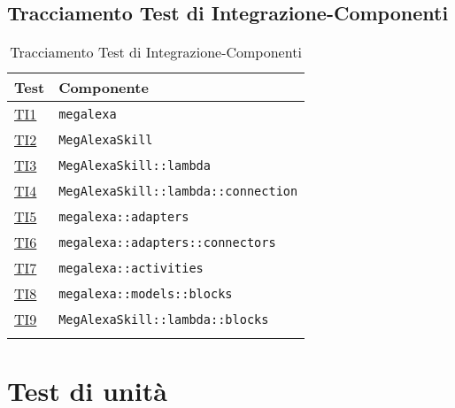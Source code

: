 \subsection{Tracciamento Test di Integrazione-Componenti}
\normalsize
\begin{longtable}{|>{\centering}m{3cm}|m{9cm}<{\centering}|}
\hline
\textbf{Test} & \textbf{Componente}\\
\hline
\endhead
\hyperlink{TI1}{TI1} & \texttt{megalexa}\\ \hline
\hyperlink{TI2}{TI2} & \texttt{MegAlexaSkill}\\ \hline
\hyperlink{TI3}{TI3} & \texttt{MegAlexaSkill::lambda}\\ \hline
\hyperlink{TI4}{TI4} & \texttt{MegAlexaSkill::lambda::connection}\\ \hline
\hyperlink{TI5}{TI5} & \texttt{megalexa::adapters}\\ \hline
\hyperlink{TI6}{TI6} & \texttt{megalexa::adapters::connectors}\\ \hline
\hyperlink{TI7}{TI7} & \texttt{megalexa::activities}\\ \hline
\hyperlink{TI8}{TI8} & \texttt{megalexa::models::blocks}\\ \hline
\hyperlink{TI9}{TI9} & \texttt{MegAlexaSkill::lambda::blocks}\\ \hline
\caption[Tracciamento Test di Integrazione-Componenti]{Tracciamento Test di Integrazione-Componenti}
\label{tabella:ts-requi}
\end{longtable}
\clearpage


\section{Test di unità}

